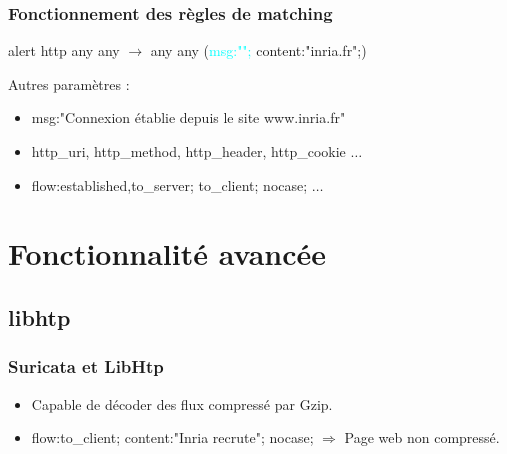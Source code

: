 \documentclass{beamer}
\begin{document}
\begin{frame}
\frametitle{Fonctionnement des règles de matching}
\begin{center}
alert http any any $\rightarrow$ any any (\textcolor{cyan}{msg:"";} content:"inria.fr";)
\end{center}
Autres paramètres :
\begin{itemize}
[triangle]
\item msg:"Connexion établie depuis le site www.inria.fr"
\item http\_uri, http\_method, http\_header, http\_cookie $\ldots$
\item flow:established,to\_server; to\_client; nocase; $\ldots$
\end{itemize}
\end{frame}

\section{Fonctionnalité avancée}
\subsection{libhtp}
\begin{frame}
\frametitle{Suricata et LibHtp}
\begin{itemize}
\item Capable de décoder des flux compressé par Gzip.
\item flow:to\_client; content:"Inria recrute"; nocase; $ \Rightarrow $ Page web non compressé.
\end{itemize}
\end{frame}
\end{document}
